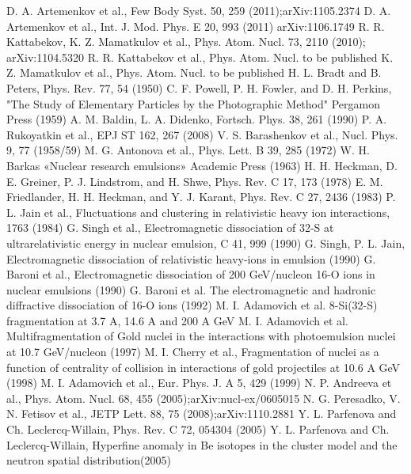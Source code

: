 \documentclass[fontsize=14pt]{scrreport}
\begin{document}
\begin{thebibliography}{57}
 {D. A. Artemenkov et al., Few Body Syst. 50, 259 (2011);arXiv:1105.2374}
 {D. A. Artemenkov et al., Int. J. Mod. Phys. E 20, 993 (2011) arXiv:1106.1749}
 {R. R. Kattabekov, K. Z. Mamatkulov et al., Phys. Atom. Nucl. 73, 2110 (2010); arXiv:1104.5320}
 {R. R. Kattabekov et al., Phys. Atom. Nucl. to be published}
 {K. Z. Mamatkulov et al., Phys. Atom. Nucl. to be published}
 {H. L. Bradt and B. Peters, Phys. Rev. 77, 54 (1950)}
 {C. F. Powell, P. H. Fowler, and D. H. Perkins, "The Study of Elementary Particles by the Photographic Method" Pergamon Press (1959)}
 {A. M. Baldin, L. A. Didenko, Fortsch. Phys. 38, 261 (1990)}
 {P. A. Rukoyatkin et al., EPJ ST 162, 267 (2008)}
 {V. S. Barashenkov et al., Nucl. Phys. 9, 77 (1958/59)}
 {M. G. Antonova et al., Phys. Lett. B 39, 285 (1972)}
 {W. H. Barkas «Nuclear research emulsions» Academic Press (1963)}
 {H. H. Heckman, D. E. Greiner, P. J. Lindstrom, and H. Shwe, Phys. Rev. C 17, 173 (1978)}
 {E. M. Friedlander, H. H. Heckman, and Y. J. Karant, Phys. Rev. C 27, 2436 (1983)}
 {P. L. Jain et al., Fluctuations and clustering in relativistic heavy ion interactions, 1763 (1984)}
 {G. Singh et al., Electromagnetic dissociation of 32-S at ultrarelativistic energy in nuclear emulsion, C 41, 999 (1990)}
 {G. Singh, P. L. Jain, Electromagnetic dissociation of relativistic heavy-ions in emulsion (1990)}
 {G. Baroni et al., Electromagnetic dissociation of 200 GeV/nucleon 16-O ions in nuclear emulsions (1990)}
 {G. Baroni et al. The electromagnetic and hadronic diffractive dissociation of 16-O ions (1992)}
 {M. I. Adamovich et al. 8-Si(32-S) fragmentation at 3.7 A, 14.6 A and 200 A GeV}
 {M. I. Adamovich et al. Multifragmentation of Gold nuclei in the interactions with photoemulsion nuclei at 10.7 GeV/nucleon (1997)}
 {M. I. Cherry et al., Fragmentation of nuclei as a function of centrality of collision in interactions of gold projectiles at 10.6 A GeV (1998)}
 {M. I. Adamovich et al., Eur. Phys. J. A 5, 429 (1999)}
 {N. P. Andreeva et al., Phys. Atom. Nucl. 68, 455 (2005);arXiv:nucl-ex/0605015}
 {N. G. Peresadko, V. N. Fetisov et al., JETP Lett. 88, 75 (2008);arXiv:1110.2881}
 {Y. L. Parfenova and Ch. Leclercq-Willain, Phys. Rev. C 72, 054304 (2005)}
 {Y. L. Parfenova and Ch. Leclercq-Willain, Hyperfine anomaly in Be isotopes in the cluster model and the neutron spatial distribution(2005)}

\end{thebibliography}
\end{document}
